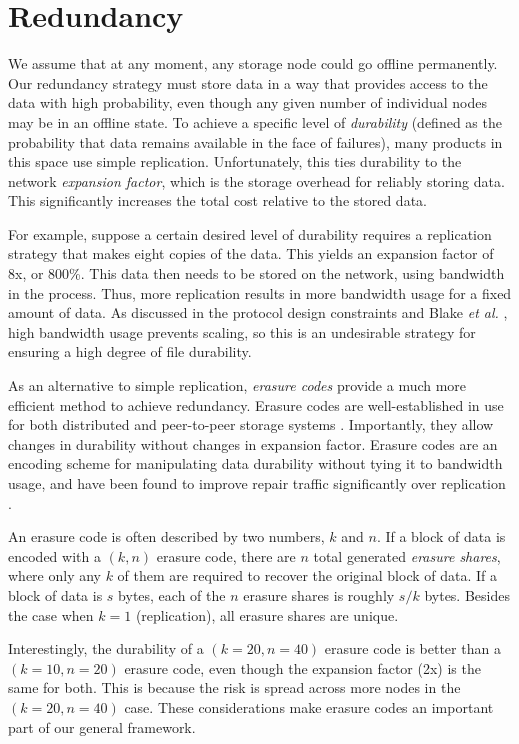 \documentclass[8pt,fleqn,openany]{book}
\begin{document}
\section{Redundancy}\label{sec:framework-redundancy}

We assume that at any moment, any storage node could go offline permanently.
Our redundancy
strategy must store data in a way that provides access to the data with high
probability, even though any given number of individual nodes may be in
an offline state. To
achieve a specific level of {\em durability} (defined as the probability that
data remains available in the face of failures), many products in this space use
simple replication. Unfortunately, this ties durability to the network {\em
expansion factor}, which is the storage overhead for reliably storing data. This
significantly increases the total cost relative to the stored data.

For example, suppose a certain desired level of durability requires a
replication strategy that makes eight copies of the data. This yields an
expansion factor of 8x, or 800\%. This data then needs to be stored on the
network, using bandwidth in the process. Thus, more replication results in more
bandwidth usage for a fixed amount of data. As discussed in the protocol design
constraints and Blake {\em et al.} \cite{pick2-churn},
high bandwidth usage prevents scaling, so this is an undesirable
strategy for ensuring a high degree of file durability.

As an alternative to simple replication, {\em erasure codes} provide a much
more efficient method to achieve redundancy.
Erasure codes are well-established in use for both distributed and peer-to-peer
storage systems \cite{p2p-lazy}.
Importantly, they allow changes in durability without changes in expansion
factor. Erasure codes are an encoding scheme for manipulating
data durability without tying it to bandwidth usage, and have been found to
improve repair traffic significantly over replication \cite{pick2-churn}.

An erasure code is often described by two numbers, $k$ and $n$. If a block of
data is encoded with a $(k,n)$ erasure code, there are $n$ total generated {\em
erasure shares}, where only any $k$ of them are required to recover the original
block of data. If a block of data is $s$ bytes, each of the $n$ erasure shares
is roughly $s/k$ bytes. Besides the case when $k=1$ (replication), all erasure
shares are unique.

Interestingly, the durability of a $(k=20,n=40)$ erasure code
is better than a $(k=10,n=20)$ erasure code, even though the expansion factor
(2x) is the same for both. This is because the risk is spread
across more nodes in the $(k=20,n=40)$ case. These considerations make erasure
codes an important part of our general framework.
\end{document}
